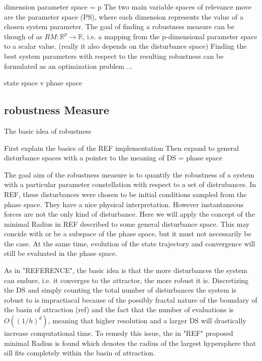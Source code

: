     dimension parameter space = p
    The two main variable spaces of relevance move are the parameter space (PS), where each dimension represents the value of a chosen system parameter. The goal of finding a robustness measure can be though of as $RM:\mathbb{R}^p \rightarrow \mathbb{R}$, i.e. a mapping from the p-dimensional parameter space to a scalar value. (really it also depends on the disturbance space) Finding the best system parameters with respect to the resulting robustness can be formulated as an optimization problem ...


    
    state space v phase space

\subsection{robustness Measure}

    The basic idea of robustness 

    First explain the basics of the REF implementation
    Then expand to general disturbance spaces with a pointer to the meaning of DS = phase space

    
    The goal aim of the robustness measure is to quantify the robustness of a system with a particular parameter constellation with respect to a set of distrubances. 
    In REF, these disturbances were chosen to be initial conditions sampled from the phase space. They have a nice physical interpretation. However instantaneous forces are not the only kind of disturbance. Here we will apply the concept of the minimal Radius in REF described to some general disturbance space. This may concide with or be a subspace of the phase space, but it must not necessarily be the case. At the same time, evolution of the state trajectory and convergence will still be evaluated in the phase space. 


    As in "REFERENCE", the basic idea is that the more disturbances the system can endure, i.e. it converges to the attractor, the more robust it is. Discretizing the DS and simply counting the total number of disturbances the system is robust to is impractiacal because of the possibly fractal nature of the boundary of the basin of attraction (ref) and the fact that the number of evaluations is $O((1/h)^d)$, meaning that higher resolution and a larger DS will drastically increase computational time. To remedy this issue, the in "REF" proposed minimal Radius is found which denotes the radius of the largest hypersphere that sill fits completely within the basin of attraction.

